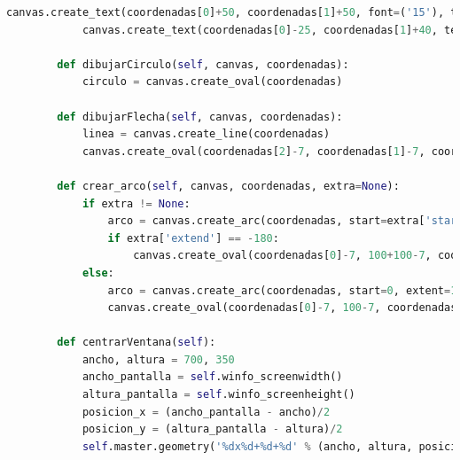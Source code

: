 \begin{lstlisting}[language=Python]
			canvas.create_text(coordenadas[0]+50, coordenadas[1]+50, font=('15'), text=text)
			canvas.create_text(coordenadas[0]-25, coordenadas[1]+40, text=text_flecha)
		
		def dibujarCirculo(self, canvas, coordenadas):
			circulo = canvas.create_oval(coordenadas)
		
		def dibujarFlecha(self, canvas, coordenadas):
			linea = canvas.create_line(coordenadas)
			canvas.create_oval(coordenadas[2]-7, coordenadas[1]-7, coordenadas[2]+7,coordenadas[1]+7, fill = 'black')
		
		def crear_arco(self, canvas, coordenadas, extra=None):
			if extra != None:
				arco = canvas.create_arc(coordenadas, start=extra['start'], extent=extra['extend'], style='arc')
				if extra['extend'] == -180:
					canvas.create_oval(coordenadas[0]-7, 100+100-7, coordenadas[0]+7, 100+100+7, fill = 'black')
			else:
				arco = canvas.create_arc(coordenadas, start=0, extent=180, style='arc')
				canvas.create_oval(coordenadas[0]-7, 100-7, coordenadas[0]+7, 100+7, fill = 'black')
		
		def centrarVentana(self):
			ancho, altura = 700, 350
			ancho_pantalla = self.winfo_screenwidth()
			altura_pantalla = self.winfo_screenheight()
			posicion_x = (ancho_pantalla - ancho)/2
			posicion_y = (altura_pantalla - altura)/2
			self.master.geometry('%dx%d+%d+%d' % (ancho, altura, posicion_x, posicion_y))
	
	\end{lstlisting}
